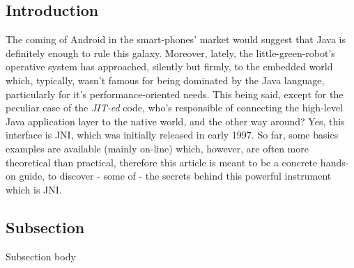 \documentclass[a4paper,10pt]{article}
\begin{document}
\vspace{6ex}	%
\begin{multicols}{2}

\section{Introduction}
The coming of Android in the smart-phones' market would suggest that Java is definitely enough to rule this galaxy. Moreover, lately, the little-green-robot's operative system has approached, silently but firmly, to the embedded world which, typically, wasn't famous for being dominated by the Java language, particularly for it's performance-oriented needs. This being said, except for the peculiar case of the \textit{JIT-ed} code, who's responsible of connecting the high-level Java application layer to the native world, and the other way around? Yes, this interface is JNI, which was initially released in early 1997. So far, some basics examples are available (mainly on-line) which, however, are often more theoretical than practical, therefore this article is meant to be a concrete hands-on guide, to discover - some of - the secrets behind this powerful instrument which is JNI. 

\subsection{Subsection}
\label{sec:subs1}
Subsection body





\nocite{liang1999jni}
\nocite{marakanajni}




\end{multicols}
\end{document}
